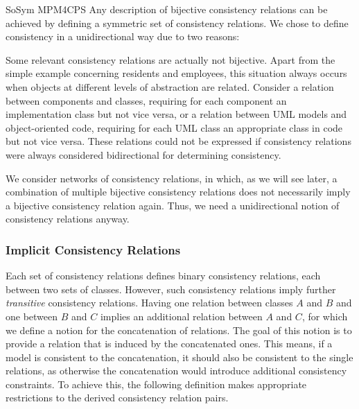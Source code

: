 \begin{copiedFrom}{SoSym MPM4CPS}
Any description of bijective consistency relations can be achieved by defining a symmetric set of consistency relations.
We chose to define consistency in a unidirectional way due to two reasons:
\begin{properenumerate}
    \item Some relevant consistency relations are actually not bijective. 
    Apart from the simple example concerning residents and employees, this situation always occurs when objects at different levels of abstraction are related.
    Consider a relation between components and classes, requiring for each component an implementation class but not vice versa, or a relation between UML models and object-oriented code, requiring for each UML class an appropriate class in code but not vice versa.
    These relations could not be expressed if consistency relations were always considered bidirectional for determining consistency.
    \item We consider networks of consistency relations, in which, as we will see later, a combination of multiple bijective consistency relations does not necessarily imply a bijective consistency relation again. 
    Thus, we need a unidirectional notion of consistency relations anyway.
\end{properenumerate}


\subsubsection{Implicit Consistency Relations}

Each set of consistency relations defines binary consistency relations, each between two sets of classes.
However, such consistency relations imply further \emph{transitive} consistency relations.
Having one relation between classes $A$ and $B$ and one between $B$ and $C$ implies an additional relation between $A$ and $C$, for which we define a notion for the concatenation of relations.
The goal of this notion is to provide a relation that is induced by the concatenated ones. This means, if a model is consistent to the concatenation, it should also be consistent to the single relations, as otherwise the concatenation would introduce additional consistency constraints.
To achieve this, the following definition makes appropriate restrictions to the derived consistency relation pairs.


\end{copiedFrom}
